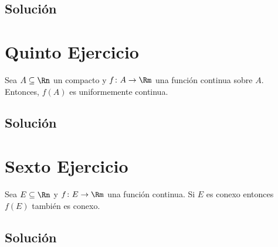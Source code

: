 \documentclass{scrartcl}
\begin{document}
\subsection{Solución}

\section{Quinto Ejercicio}

Sea \(A\subseteq\Rn\) un compacto y \(f\colon A\to\Rm\)
una función continua sobre \(A\). Entonces, \(f(A)\) es
uniformemente continua.

\subsection{Solución}

\section{Sexto Ejercicio}

Sea \(E\subseteq\Rn\) y \(f \colon E\to\Rm\) una función continua.
Si \(E\) es conexo entonces \(f(E)\) también es conexo.

\subsection{Solución}


\end{document}
